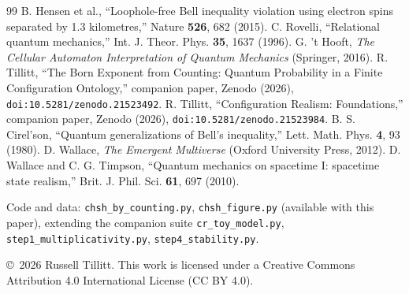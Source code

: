 \documentclass[11pt]{article}
\theoremstyle{definition}
\theoremstyle{remark}
\begin{document}
\begin{thebibliography}{99}
 B. Hensen et al., ``Loophole-free Bell inequality violation using electron spins separated by 1.3 kilometres,'' Nature \textbf{526}, 682 (2015).
 C. Rovelli, ``Relational quantum mechanics,'' Int. J. Theor. Phys. \textbf{35}, 1637 (1996).
 G. 't Hooft, \emph{The Cellular Automaton Interpretation of Quantum Mechanics} (Springer, 2016).
 R. Tillitt, ``The Born Exponent from Counting: Quantum Probability in a Finite Configuration Ontology,'' companion paper, Zenodo (2026), \texttt{doi:10.5281/zenodo.21523492}.
 R. Tillitt, ``Configuration Realism: Foundations,'' companion paper, Zenodo (2026), \texttt{doi:10.5281/zenodo.21523984}.
 B. S. Cirel'son, ``Quantum generalizations of Bell's inequality,'' Lett. Math. Phys. \textbf{4}, 93 (1980).
 D. Wallace, \emph{The Emergent Multiverse} (Oxford University Press, 2012).
 D. Wallace and C. G. Timpson, ``Quantum mechanics on spacetime I: spacetime state realism,'' Brit. J. Phil. Sci. \textbf{61}, 697 (2010).
\end{thebibliography}

\vspace{1em}
\noindent\small Code and data: \texttt{chsh\_by\_counting.py}, \texttt{chsh\_figure.py} (available with this paper), extending the companion suite \texttt{cr\_toy\_model.py}, \texttt{step1\_multiplicativity.py}, \texttt{step4\_stability.py}.

\smallskip
\noindent\small \copyright\ 2026 Russell Tillitt. This work is licensed under a Creative Commons Attribution 4.0 International License (CC BY 4.0).
\end{document}

